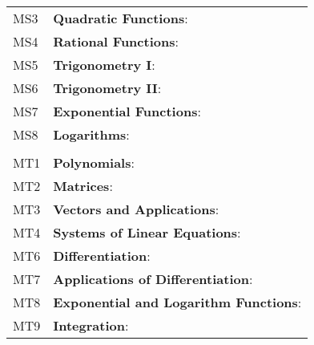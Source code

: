 \documentclass[varwidth=144mm, 12pt]{standalone}
\begin{document}
\begin{longtable}{lp{}}
MS3 & \textbf{Quadratic Functions}: \\
MS4 & \textbf{Rational Functions}: \\
MS5 & \textbf{Trigonometry I}: \\
MS6 & \textbf{Trigonometry II}: \\
MS7 & \textbf{Exponential Functions}: \\
MS8 & \textbf{Logarithms}: \\
& \\
MT1 & \textbf{Polynomials}: \\
MT2 & \textbf{Matrices}: \\
MT3 & \textbf{Vectors and Applications}: \\
MT4 & \textbf{Systems of Linear Equations}: \\
MT6 & \textbf{Differentiation}: \\
MT7 & \textbf{Applications of Differentiation}: \\
MT8 & \textbf{Exponential and Logarithm Functions}: \\
MT9 & \textbf{Integration}: \\
\end{longtable}
\end{document}
